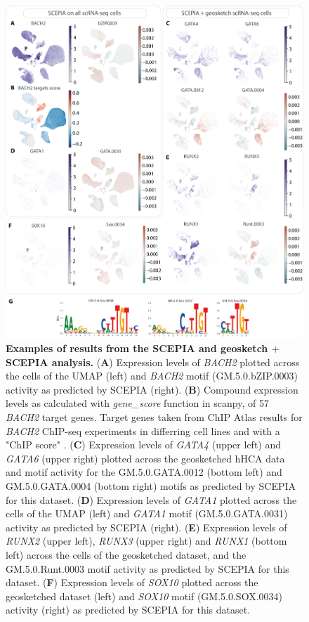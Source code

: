 \begin{figure}
    \centering
    \includegraphics[height=1\linewidth]{ch.scepia/imgs/SCEPIA_SCEPIAGEO_BiologicalExamples_Myriad_v9_SuppFigFeatures1.png}
    \caption{\textbf{Examples of results from the SCEPIA and geosketch $+$ SCEPIA analysis.} (\textbf{A}) Expression levels of \textit{BACH2} plotted across the cells of the UMAP (left) and \textit{BACH2} motif (GM.5.0.bZIP.0003) activity as predicted by SCEPIA (right). (\textbf{B}) Compound expression levels as calculated with \textit{gene\_score} function in scanpy, of 57 \textit{BACH2} target genes. Target genes taken from ChIP Atlas \cite{Oki2018,Zou2022} results for \textit{BACH2} ChIP-seq experiments in differring cell lines and with a "ChIP score" . (\textbf{C}) Expression levels of \textit{GATA4} (upper left) and \textit{GATA6} (upper right) plotted across the geosketched hHCA data and motif activity for the GM.5.0.GATA.0012 (bottom left) and GM.5.0.GATA.0004 (bottom right) motifs as predicted by SCEPIA for this dataset. (\textbf{D}) Expression levels of \textit{GATA1} plotted across the cells of the UMAP (left) and \textit{GATA1} motif (GM.5.0.GATA.0031) activity as predicted by SCEPIA (right). (\textbf{E}) Expression levels of \textit{RUNX2} (upper left), \textit{RUNX3} (upper right) and \textit{RUNX1} (bottom left) across the cells of the geosketched dataset, and the GM.5.0.Runt.0003 motif activity as predicted by SCEPIA for this dataset. (\textbf{F}) Expression levels of \textit{SOX10} plotted across the geosketched dataset (left) and \textit{SOX10} motif (GM.5.0.SOX.0034) activity (right) as predicted by SCEPIA for this dataset.}
    \label{fig:scepia_features1}
\end{figure}

